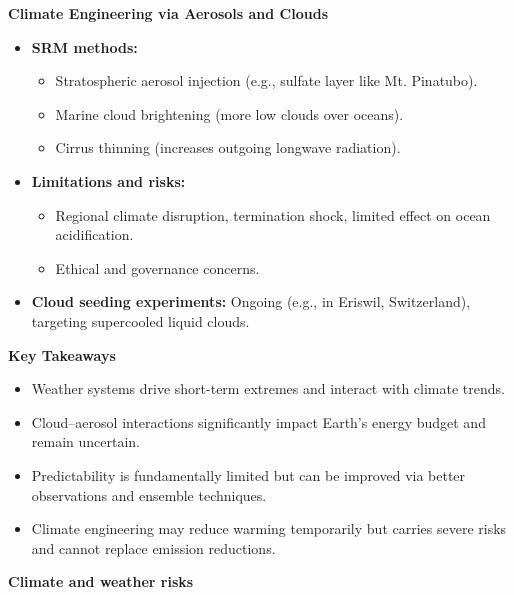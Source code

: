\documentclass[fontsize=8pt, a4paper, landscape, fleqn]{scrartcl}
\renewcommand{\section}[1]{%
    \noindent\colorbox{sectioncolor}{%
        \parbox{\dimexpr\columnwidth-2\fboxsep}{\color{white}\textbf{#1}}}%
    \vspace{0.5mm}%
}
\renewcommand{\subsection}[1]{%
    \noindent\colorbox{subsectioncolor}{%
        \parbox{\dimexpr\columnwidth-2\fboxsep}{\color{white}\textbf{#1}}}%
    \vspace{0.5mm}%
}
\begin{document}
\begin{multicols*}{3}[\raggedcolumns]
\subsection{Climate Engineering via Aerosols and Clouds}
\begin{itemize}
    \item \textbf{SRM methods:}
    \begin{itemize}
        \item Stratospheric aerosol injection (e.g., sulfate layer like Mt. Pinatubo).
        \item Marine cloud brightening (more low clouds over oceans).
        \item Cirrus thinning (increases outgoing longwave radiation).
    \end{itemize}
    \item \textbf{Limitations and risks:}
    \begin{itemize}
        \item Regional climate disruption, termination shock, limited effect on ocean acidification.
        \item Ethical and governance concerns.
    \end{itemize}
    \item \textbf{Cloud seeding experiments:} Ongoing (e.g., in Eriswil, Switzerland), targeting supercooled liquid clouds.
\end{itemize}

\subsection{Key Takeaways}
\begin{itemize}
    \item Weather systems drive short-term extremes and interact with climate trends.
    \item Cloud–aerosol interactions significantly impact Earth's energy budget and remain uncertain.
    \item Predictability is fundamentally limited but can be improved via better observations and ensemble techniques.
    \item Climate engineering may reduce warming temporarily but carries severe risks and cannot replace emission reductions.
\end{itemize}

\section{Climate and weather risks }

\end{multicols*}
\end{document}
